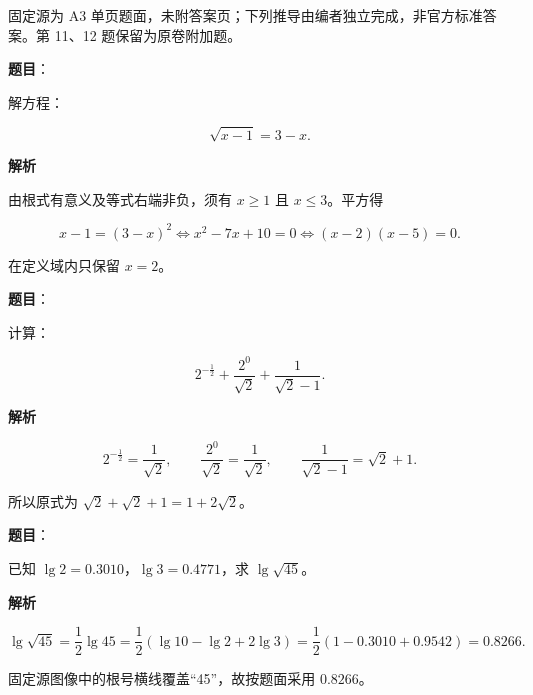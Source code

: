 

\begin{gktip}
固定源为 A3 单页题面，未附答案页；下列推导由编者独立完成，非官方标准答案。第 11、12 题保留为原卷附加题。
\end{gktip}

\begin{answer}

\textbf{题目}：

解方程：

\nopagebreak[4]
\[
\sqrt{x-1}=3-x.
\]

\textbf{解析}

由根式有意义及等式右端非负，须有 $x\geqslant1$ 且 $x\leqslant3$。平方得

\nopagebreak[4]
\[
x-1=(3-x)^2
\Longleftrightarrow x^2-7x+10=0
\Longleftrightarrow (x-2)(x-5)=0.
\]

在定义域内只保留 $x=2$。


\end{answer}
\begin{answer}

\textbf{题目}：

计算：

\nopagebreak[4]
\[
2^{-\frac12}+\frac{2^0}{\sqrt2}+\frac1{\sqrt2-1}.
\]

\textbf{解析}

\nopagebreak[4]
\[
2^{-\frac12}=\frac1{\sqrt2},
\qquad
\frac{2^0}{\sqrt2}=\frac1{\sqrt2},
\qquad
\frac1{\sqrt2-1}=\sqrt2+1.
\]

所以原式为 $\sqrt2+\sqrt2+1=1+2\sqrt2$。


\end{answer}
\begin{answer}

\textbf{题目}：

已知 $\lg2=0.3010$，$\lg3=0.4771$，求 $\lg\sqrt{45}$。

\textbf{解析}

\nopagebreak[4]
\[
\lg\sqrt{45}=\frac12\lg45
=\frac12\left(\lg10-\lg2+2\lg3\right)
=\frac12(1-0.3010+0.9542)=0.8266.
\]

固定源图像中的根号横线覆盖“45”，故按题面采用 $0.8266$。


\end{answer}

